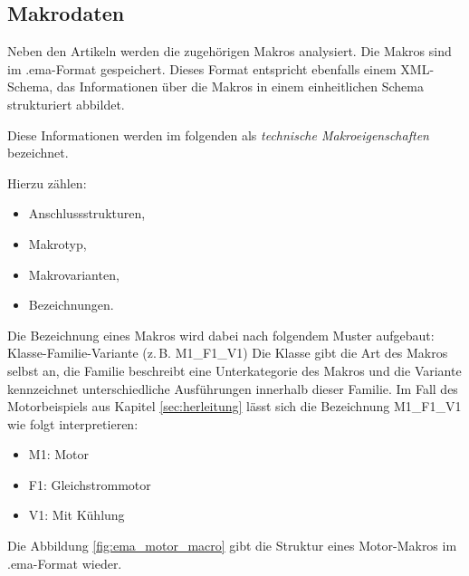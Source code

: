 \subsection{Makrodaten} 

Neben den Artikeln werden die zugehörigen Makros analysiert. Die Makros sind im .ema-Format gespeichert. 
Dieses Format entspricht ebenfalls einem XML-Schema, das Informationen über die Makros in einem einheitlichen Schema strukturiert abbildet.

Diese Informationen werden im folgenden als \textit{technische Makroeigenschaften} bezeichnet. 

Hierzu zählen: 

\begin{itemize} 
    \item Anschlussstrukturen,  
    \item Makrotyp,
    \item Makrovarianten, 
    \item Bezeichnungen. 
\end{itemize} 


Die Bezeichnung eines Makros wird dabei nach folgendem Muster aufgebaut: Klasse-Familie-Variante (z.\,B. M1\_F1\_V1)
Die Klasse gibt die Art des Makros selbst an, die Familie beschreibt eine Unterkategorie des Makros und die Variante kennzeichnet unterschiedliche Ausführungen innerhalb dieser Familie.
Im Fall des Motorbeispiels aus Kapitel \ref{sec:herleitung} lässt sich die Bezeichnung M1\_F1\_V1 wie folgt interpretieren:

\begin{itemize}
    \item  M1: Motor
    \item  F1: Gleichstrommotor
    \item  V1: Mit Kühlung
\end{itemize}

Die Abbildung \ref{fig:ema_motor_macro} gibt die Struktur eines Motor-Makros im .ema-Format wieder.

